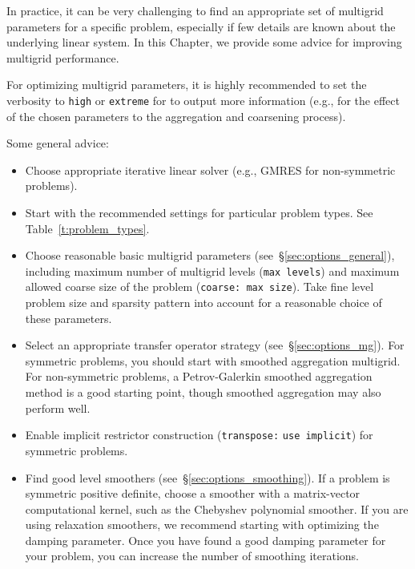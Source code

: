 In practice, it can be very challenging to find an appropriate set of multigrid
parameters for a specific problem, especially if few details are known about the
underlying linear system. In this Chapter, we provide some advice for improving
multigrid performance.

\begin{mycomment}
For optimizing multigrid parameters, it is highly recommended to set the
verbosity to \verb|high| or \verb|extreme| for \muelu{} to output more
information (e.g., for the effect of the chosen parameters to the aggregation
and coarsening process).
\end{mycomment}

Some general advice:
\begin{itemize}
  \item
    Choose appropriate iterative linear solver (e.g., GMRES for non-symmetric problems).

  \item
    Start with the recommended settings for particular problem types. See
    Table~\ref{t:problem_types}.

  \item
    Choose reasonable basic multigrid parameters
    (see~\S\ref{sec:options_general}), including maximum number of multigrid
    levels (\texttt{max levels}) and maximum allowed coarse size of the problem
    (\texttt{coarse: max size}). Take fine level problem size and sparsity
    pattern into account for a reasonable choice of these parameters.

  \item
    Select an appropriate transfer operator strategy
    (see~\S\ref{sec:options_mg}). For symmetric problems, you should start with smoothed
    aggregation multigrid. For non-symmetric problems, a Petrov-Galerkin smoothed
    aggregation method is a good starting point, though smoothed aggregation may
    also perform well.

  \item
    Enable implicit restrictor construction (\texttt{transpose:} \texttt{use implicit}) for symmetric
    problems.

  \item
    Find good level smoothers (see~\S\ref{sec:options_smoothing}). If a problem
    is symmetric positive definite, choose a smoother with a matrix-vector
    computational kernel, such as the Chebyshev polynomial smoother. If you are
    using relaxation smoothers, we recommend starting with optimizing the
    damping parameter. Once you have found a good damping parameter for your
    problem, you can increase the number of smoothing iterations.


\end{itemize}
